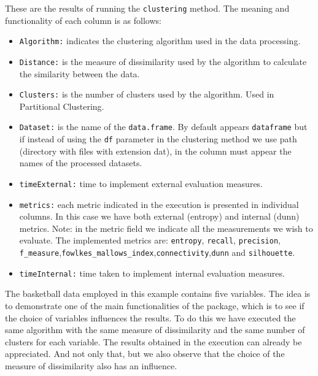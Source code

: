 These are the results of running the \texttt{clustering} method. The meaning and functionality of each column is as follows:
\begin{itemize}
  \item \texttt{Algorithm:} indicates the clustering algorithm used in the data processing.
  \item \texttt{Distance:} is the measure of dissimilarity used by the algorithm to calculate the similarity between the data.
  \item \texttt{Clusters:} is the number of clusters used by the algorithm. Used in Partitional Clustering.
  \item \texttt{Dataset:} is the name of the \texttt{data.frame}. By default appears \texttt{dataframe} but if instead of using the \texttt{df} parameter in the clustering method we use path (directory with files with extension dat), in the column must appear the names of the processed datasets.
  \item \texttt{timeExternal:} time to implement external evaluation measures.
  \item \texttt{metrics:} each metric indicated in the execution is presented in individual columns. In this case we have both external (entropy) and internal (dunn) metrics.
  Note: in the metric field we indicate all the measurements we wish to evaluate. The implemented metrics are: \texttt{entropy}, \texttt{recall}, \texttt{precision}, \texttt{f\_measure},\texttt{fowlkes\_mallows\_index},\texttt{connectivity},\texttt{dunn} and \texttt{silhouette}.
  \item \texttt{timeInternal:} time taken to implement internal evaluation measures.\\
\end{itemize}

The basketball data employed in this example contains five variables. The idea is to demonstrate one of the main functionalities of the package, which is to see if the choice of variables influences the results. To do this we have executed the same algorithm with the same measure of dissimilarity and the same number of clusters for each variable. The results obtained in the execution can already be appreciated. And not only that, but we also observe that the choice of the measure of dissimilarity also has an influence.

